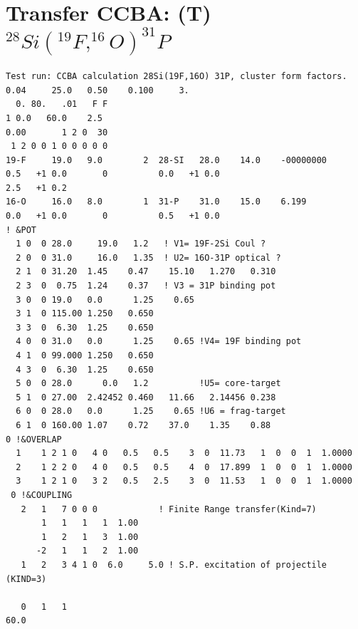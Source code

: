 \documentclass[11pt]{book}
\begin{document}
\section{Transfer CCBA: (T) $^{28}Si(^{19}F,^{16}O)^{31}P$}
\begin{small} 
\begin{lstlisting}[frame=single]
Test run: CCBA calculation 28Si(19F,16O) 31P, cluster form factors.
0.04     25.0   0.50    0.100     3.
  0. 80.   .01   F F
1 0.0   60.0    2.5
0.00       1 2 0  30
 1 2 0 0 1 0 0 0 0 0
19-F     19.0   9.0        2  28-SI   28.0    14.0    -00000000
0.5   +1 0.0       0          0.0   +1 0.0
2.5   +1 0.2
16-O     16.0   8.0        1  31-P    31.0    15.0    6.199
0.0   +1 0.0       0          0.5   +1 0.0
! &POT
  1 0  0 28.0     19.0   1.2   ! V1= 19F-2Si Coul ?
  2 0  0 31.0     16.0   1.35  ! U2= 16O-31P optical ? 
  2 1  0 31.20  1.45    0.47    15.10   1.270   0.310
  2 3  0  0.75  1.24    0.37   ! V3 = 31P binding pot
  3 0  0 19.0   0.0      1.25    0.65
  3 1  0 115.00 1.250   0.650
  3 3  0  6.30  1.25    0.650
  4 0  0 31.0   0.0      1.25    0.65 !V4= 19F binding pot 
  4 1  0 99.000 1.250   0.650
  4 3  0  6.30  1.25    0.650
  5 0  0 28.0      0.0   1.2          !U5= core-target 
  5 1  0 27.00  2.42452 0.460   11.66   2.14456 0.238
  6 0  0 28.0   0.0      1.25    0.65 !U6 = frag-target 
  6 1  0 160.00 1.07    0.72    37.0    1.35    0.88
0 !&OVERLAP
  1    1 2 1 0   4 0   0.5   0.5    3  0  11.73   1  0  0  1  1.0000
  2    1 2 2 0   4 0   0.5   0.5    4  0  17.899  1  0  0  1  1.0000
  3    1 2 1 0   3 2   0.5   2.5    3  0  11.53   1  0  0  1  1.0000
 0 !&COUPLING
   2   1   7 0 0 0            ! Finite Range transfer(Kind=7)
       1   1   1   1  1.00
       1   2   1   3  1.00
      -2   1   1   2  1.00
   1   2   3 4 1 0  6.0     5.0 ! S.P. excitation of projectile (KIND=3)

   0   1   1
60.0
\end{lstlisting}
\end{small} 
\end{document}
